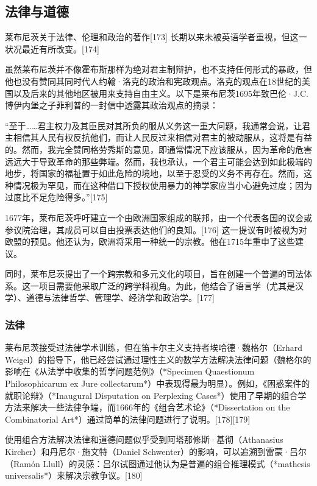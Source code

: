 \subsection{法律与道德}

莱布尼茨关于法律、伦理和政治的著作[173] 长期以来未被英语学者重视，但这一状况最近有所改变。[174]

虽然莱布尼茨并不像霍布斯那样为绝对君主制辩护，也不支持任何形式的暴政，但他也没有赞同其同时代人约翰·洛克的政治和宪政观点。洛克的观点在18世纪的美国以及后来的其他地区被用来支持自由主义。以下是莱布尼茨1695年致巴伦·J.C.博伊内堡之子菲利普的一封信中透露其政治观点的摘录：

“至于……君主权力及其臣民对其所负的服从义务这一重大问题，我通常会说，让君主相信其人民有权反抗他们，而让人民反过来相信对君主的被动服从，这将是有益的。然而，我完全赞同格劳秀斯的意见，即通常情况下应该服从，因为革命的危害远远大于导致革命的那些弊端。然而，我也承认，一个君主可能会达到如此极端的地步，将国家的福祉置于如此危险的境地，以至于忍受的义务不再存在。然而，这种情况极为罕见，而在这种借口下授权使用暴力的神学家应当小心避免过度；因为过度比不足危险得多。”[175]

1677年，莱布尼茨呼吁建立一个由欧洲国家组成的联邦，由一个代表各国的议会或参议院治理，其成员可以自由投票表达他们的良知。[176] 这一提议有时被视为对欧盟的预见。他还认为，欧洲将采用一种统一的宗教。他在1715年重申了这些建议。

同时，莱布尼茨提出了一个跨宗教和多元文化的项目，旨在创建一个普遍的司法体系。这一项目需要他采取广泛的跨学科视角。为此，他结合了语言学（尤其是汉学）、道德与法律哲学、管理学、经济学和政治学。[177]
\subsubsection{法律}
莱布尼茨接受过法律学术训练，但在笛卡尔主义支持者埃哈德·魏格尔（Erhard Weigel）的指导下，他已经尝试通过理性主义的数学方法解决法律问题（魏格尔的影响在《从法学中收集的哲学问题范例》（*Specimen Quaestionum Philosophicarum ex Jure collectarum*）中表现得最为明显）。例如，《困惑案件的就职论辩》（*Inaugural Disputation on Perplexing Cases*）使用了早期的组合学方法来解决一些法律争端，而1666年的《组合艺术论》（*Dissertation on the Combinatorial Art*）通过简单的法律问题进行了说明。[178][179]  

使用组合方法解决法律和道德问题似乎受到阿塔那修斯·基彻（Athanasius Kircher）和丹尼尔·施文特（Daniel Schwenter）的影响，可以追溯到雷蒙·吕尔（Ramón Llull）的灵感：吕尔试图通过他认为是普遍的组合推理模式（*mathesis universalis*）来解决宗教争议。[180]  

